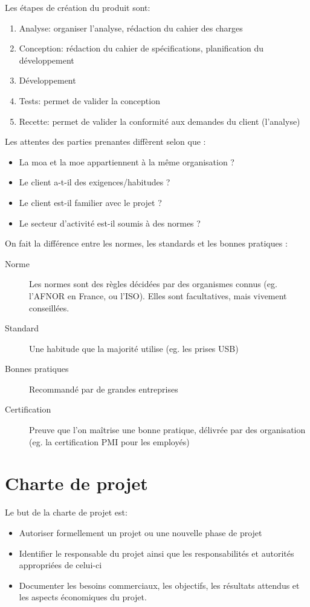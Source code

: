 \documentclass[10pt,a4paper,french]{article}
\begin{document}
Les étapes de création du produit sont:
\begin{enumerate}
\item Analyse: organiser l'analyse, rédaction du cahier des charges
\item Conception: rédaction du cahier de spécifications, planification du développement
\item Développement
\item Tests: permet de valider la conception
\item Recette: permet de valider la conformité aux demandes du client (l'analyse)
\end{enumerate}

Les attentes des parties prenantes diffèrent selon que :
\begin{itemize}
\item La \gls{moa} et la \gls{moe} appartiennent à la même organisation ?
\item Le client a-t-il des exigences/habitudes ?
\item Le client est-il familier avec le projet ?
\item Le secteur d'activité est-il soumis à des normes ?
\end{itemize}

On fait la différence entre les normes, les standards et les bonnes pratiques :
\begin{description}
\item[Norme] Les normes sont des règles décidées par des organismes connus (eg. l'AFNOR en France, ou l'ISO). Elles sont facultatives, mais vivement conseillées.
\item[Standard] Une habitude que la majorité utilise (eg. les prises USB)
\item[Bonnes pratiques] Recommandé par de grandes entreprises
\item[Certification] Preuve que l'on maîtrise une bonne pratique, délivrée par des organisation (eg. la certification PMI pour les employés)
\end{description}

\section{Charte de projet}

Le but de la charte de projet est:
\begin{itemize}
\item Autoriser formellement un projet ou une nouvelle phase de projet
\item Identifier le responsable du projet ainsi que les responsabilités et autorités appropriées de celui-ci
\item Documenter les besoins commerciaux, les objectifs, les résultats attendus et les aspects économiques du projet.
\end{itemize}
\end{document}
